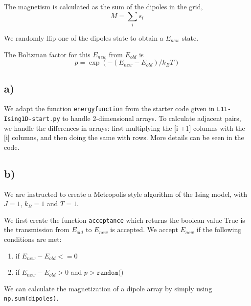 \documentclass{article}
\begin{document}
The magnetism is calculated as the sum of the dipoles in the grid, 
\[ M = \sum_{i} s_i \]

We randomly flip one of the dipoles state to obtain a $E_{new}$ state.

The Boltzman factor for this  $E_{new}$ from $E_{old}$ is 
\[ p = \exp(-(E_{new} - E_{old})/k_B T) \]

\subsection*{a)}
We adapt the function \texttt{energyfunction} from the starter code given in \newline \texttt{L11-Ising1D-start.py} to handle 2-dimensional arrays. To calculate adjacent pairs, we handle the differences in arrays: first multiplying the [i +1] columns with the [i] columns, and then doing the same with rows. More details can be seen in the code. 

\subsection*{b)}
We are instructed to create a Metropolis style algorithm of the Ising model, with $J = 1$, $k_B = 1$ and $T = 1$. 

We first create the function \texttt{acceptance} which returns the boolean value True is the transmission from $E_{old}$ to $E_{new}$ is accepted. We accept $E_{new}$ if the following conditions are met: 
\begin{enumerate}
    \item if $E_{new} - E_{old} <= 0$
 \item if $E_{new}-E_{old} > 0$ and $p > \texttt{random()}$
 
\end{enumerate}

We can calculate the magnetization of a dipole array by simply using \texttt{np.sum(dipoles)}.
\end{document}
